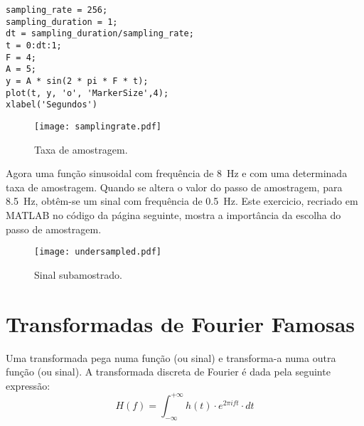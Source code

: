 \begin{lstlisting}[style=Matlab-editor, basicstyle=\small, caption={Slide 3.}, label={lst: sampling rate}]
sampling_rate = 256;
sampling_duration = 1; 
dt = sampling_duration/sampling_rate;
t = 0:dt:1;
F = 4;
A = 5;
y = A * sin(2 * pi * F * t);
plot(t, y, 'o', 'MarkerSize',4);
xlabel('Segundos')
\end{lstlisting}
    
\begin{figure}[!ht]
\centering
\texttt{[image: samplingrate.pdf]}
\caption{Taxa de amostragem.}
\label{fig:sampling rate}
\end{figure}

Agora uma função sinusoidal com frequência de 8~Hz e com uma determinada taxa de amostragem. Quando se altera o valor do passo de amostragem, para 8.5~Hz, obtêm-se um sinal com frequência de 0.5~Hz. Este exercicio, recriado em MATLAB no código da página seguinte, mostra a importância da escolha do passo de amostragem.


\newpage



\begin{figure}[!ht]
\centering
\texttt{[image: undersampled.pdf]}
\caption{Sinal subamostrado.}
\label{fig:undersampled}
\end{figure}

\newpage

\section{Transformadas de Fourier Famosas}

Uma transformada pega numa função (ou sinal) e transforma-a numa outra função (ou sinal).
A transformada discreta de Fourier é dada pela seguinte expressão:
\begin{equation}
    H(f)=\int_{-\infty}^{+\infty} h(t)\cdot e^{2\pi ift} \cdot dt 
\end{equation}

